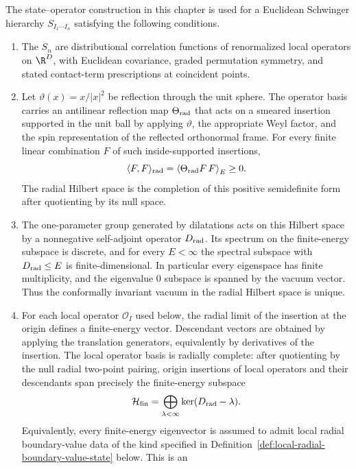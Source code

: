 \begin{hypothesis}
\label{hyp:radial-reconstruction-data}
The state--operator construction in this chapter is used for a Euclidean
Schwinger hierarchy \(S_{I_1\cdots I_n}\) satisfying the following conditions.
\begin{enumerate}
  \item The \(S_n\) are distributional correlation functions of renormalized
  local operators on \(\R^D\), with Euclidean covariance, graded permutation
  symmetry, and stated contact-term prescriptions at coincident points.
  \item Let \(\vartheta(x)=x/|x|^2\) be reflection through the unit sphere.  The
  operator basis carries an antilinear reflection map \(\Theta_{\rm rad}\) that
  acts on a smeared insertion supported in the unit ball by applying
  \(\vartheta\), the appropriate Weyl factor, and the spin representation of
  the reflected orthonormal frame.  For every finite linear combination \(F\)
  of such inside-supported insertions,
  \[
    \langle F,F\rangle_{\rm rad}
    =
    \left\langle \Theta_{\rm rad}F\,F\right\rangle_E
    \geq0 .
  \]
  The radial Hilbert space is the completion of this positive semidefinite
  form after quotienting by its null space.
  \item The one-parameter group generated by dilatations acts on this Hilbert
  space by a nonnegative self-adjoint operator \(D_{\rm rad}\).  Its spectrum
  on the finite-energy subspace is discrete, and for every \(E<\infty\) the
  spectral subspace with \(D_{\rm rad}\le E\) is finite-dimensional.  In
  particular every eigenspace has finite multiplicity, and the eigenvalue
  \(0\) subspace is spanned by the vacuum vector.  Thus the conformally
  invariant vacuum in the radial Hilbert space is unique.
  \item For each local operator \(\mathcal O_I\) used below, the radial limit of
  the insertion at the origin defines a finite-energy vector.  Descendant
  vectors are obtained by applying the translation generators, equivalently by
  derivatives of the insertion.  The local operator basis is radially complete:
  after quotienting by the null radial two-point pairing, origin insertions of
  local operators and their descendants span precisely the finite-energy
  subspace
  \[
    \mathcal H_{\rm fin}
    =
    \bigoplus_{\lambda<\infty}\ker(D_{\rm rad}-\lambda).
  \]
  Equivalently, every finite-energy eigenvector is assumed to admit local
  radial boundary-value data of the kind specified in
  Definition~\ref{def:local-radial-boundary-value-state} below.  This is an

\end{enumerate}
\end{hypothesis}
